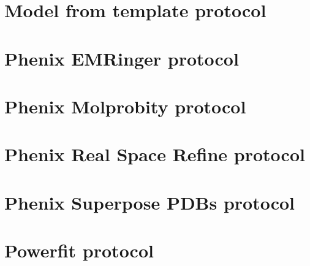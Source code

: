 \documentclass[12pt, draft]{article} %
\begin{document}
\begin{appendices}
\begin{itemize}
\begin{itemize}
  
  \end{itemize}
  
  
 \end{itemize}


\section{Model from template protocol}
\label{app:modelFromTemplate}

\section{Phenix EMRinger protocol}
\label{app:emRingerProtocol}

\section{Phenix Molprobity protocol}
\label{app:molprobityProtocol}

\section{Phenix Real Space Refine protocol}
\label{app:realSpaceRefineProtocol}

\section{Phenix Superpose PDBs protocol}
\label{app:superposePdbsProtocol}

\section{Powerfit protocol}
\label{app:powerfitProtocol}








\end{appendices}
\end{document}

